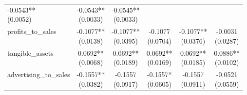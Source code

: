 \documentclass{article}
\begin{document}
\begin{longtable}{@{\extracolsep{\fill}}lccccc}
    \makecell{-0.0543**                                                           \\(0.0052)} &
    \makecell{-0.0543**                                                           \\(0.0033)} &
    \makecell{-0.0545**                                                           \\(0.0033)} \\
    profits\_to\_sales            &
    \makecell{-0.1077**                                                           \\(0.0138)} &
    \makecell{-0.1077**                                                           \\(0.0395)} &
    \makecell{-0.1077                                                             \\(0.0704)} &
    \makecell{-0.1077**                                                           \\(0.0376)} &
    \makecell{-0.0031                                                             \\(0.0287)} \\
    tangible\_assets              &
    \makecell{0.0692**                                                            \\(0.0068)} &
    \makecell{0.0692**                                                            \\(0.0189)} &
    \makecell{0.0692**                                                            \\(0.0169)} &
    \makecell{0.0692**                                                            \\(0.0185)} &
    \makecell{0.0886**                                                            \\(0.0102)} \\
    advertising\_to\_sales        &
    \makecell{-0.1557**                                                           \\(0.0382)} &
    \makecell{-0.1557                                                             \\(0.0917)} &
    \makecell{-0.1557*                                                            \\(0.0605)} &
    \makecell{-0.1557                                                             \\(0.0911)} &
    \makecell{-0.0521                                                             \\(0.0559)} \\

\end{longtable}
\end{document}
